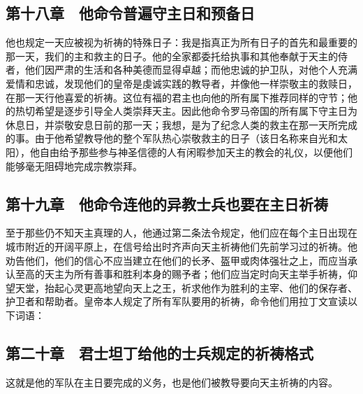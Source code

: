 
\subsection{第十八章　他命令普遍守主日和预备日}

他也规定一天应被视为祈祷的特殊日子：我是指真正为所有日子的首先和最重要的那一天，我们的主和救主的日子。他的全家都委托给执事和其他奉献于天主的侍者，他们因严肃的生活和各种美德而显得卓越；而他忠诚的护卫队，对他个人充满爱情和忠诚，发现他们的皇帝是虔诚实践的教导者，并像他一样崇敬主的救赎日，在那一天行他喜爱的祈祷。这位有福的君主也向他的所有属下推荐同样的守节；他的热切希望是逐步引导全人类崇拜天主。因此他命令罗马帝国的所有属下守主日为休息日，并崇敬安息日前的那一天；我想，是为了纪念人类的救主在那一天所完成的事。由于他希望教导他的整个军队热心崇敬救主的日子（该日名称来自光和太阳），他自由给予那些参与神圣信德的人有闲暇参加天主的教会的礼仪，以便他们能够毫无阻碍地完成宗教崇拜。\par


\subsection{第十九章　他命令连他的异教士兵也要在主日祈祷}

至于那些仍不知天主真理的人，他通过第二条法令规定，他们应在每个主日出现在城市附近的开阔平原上，在信号给出时齐声向天主祈祷他们先前学习过的祈祷。他劝告他们，他们的信心不应当建立在他们的长矛、盔甲或肉体强壮之上，而应当承认至高的天主为所有善事和胜利本身的赐予者；他们应当定时向天主举手祈祷，仰望天堂，抬起心灵更高地望向天上之王，祈求他作为胜利的主宰、他们的保存者、护卫者和帮助者。皇帝本人规定了所有军队要用的祈祷，命令他们用拉丁文宣读以下词语：\par


\subsection{第二十章　君士坦丁给他的士兵规定的祈祷格式}

这就是他的军队在主日要完成的义务，也是他们被教导要向天主祈祷的内容。\par

